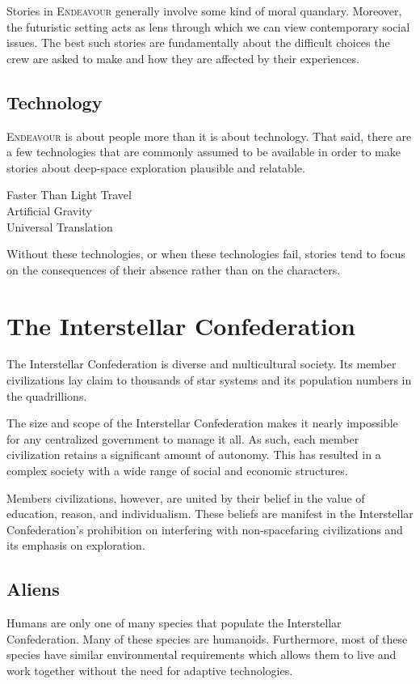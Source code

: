 \documentclass[11pt, a5paper, parskip=half-, DIV=12]{scrartcl}
\newcommand{\ENDEAVOUR}{\textsc{Endeavour}}%
\begin{document}
Stories in \ENDEAVOUR{} generally involve some kind of moral quandary. Moreover, the futuristic setting acts as lens through which we can view contemporary social issues. The best such stories are fundamentally about the difficult choices the crew are asked to make and how they are affected by their experiences.  

\subsection*{Technology}
\ENDEAVOUR{} is about people more than it is about technology. That said, there are a few technologies that are commonly assumed to be available in order to make stories about deep-space exploration plausible and relatable.
\begin{description}
	\item[Faster Than Light Travel]
	\item[Artificial Gravity]
	\item[Universal Translation]
\end{description}
Without these technologies, or when these technologies fail, stories tend to focus on the consequences of their absence rather than on the characters.

\newpage

\section*{The Interstellar Confederation}
The Interstellar Confederation is diverse and multicultural society. Its member civilizations lay claim to thousands of star systems and its population numbers in the quadrillions. 

The size and scope of the Interstellar Confederation makes it nearly impossible for any centralized government to manage it all. As such, each member civilization retains a significant amount of autonomy. This has resulted in a complex society with a wide range of social and economic structures.

Members civilizations, however, are united by their belief in the value of education, reason, and individualism. These beliefs are manifest in the Interstellar Confederation's prohibition on interfering with non-spacefaring civilizations and its emphasis on exploration.

\subsection*{Aliens}
Humans are only one of many species that populate the Interstellar Confederation. Many of these species are humanoids. Furthermore, most of these species have similar environmental requirements which allows them to live and work together without the need for adaptive technologies.
\end{document}
